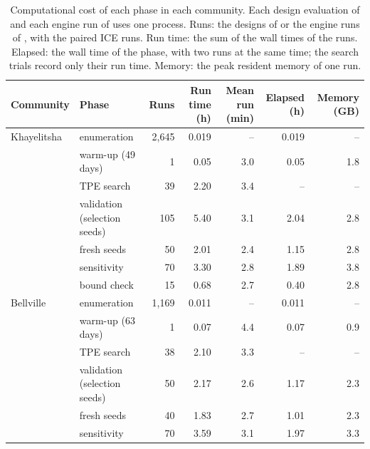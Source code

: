 \begin{table}[htbp]
    \centering
    \footnotesize
    \caption[Computational cost of each phase in each community]{Computational cost of each phase in each community. Each design evaluation of \MR{} and each engine run of \MA{} uses one process. Runs: the designs of \MR{} or the engine runs of \MA, with the paired ICE runs. Run time: the sum of the wall times of the runs. Elapsed: the wall time of the phase, with two runs at the same time; the search trials record only their run time. Memory: the peak resident memory of one run.}
    \label{tab:computational_cost}
    \begin{tabularx}{\linewidth}{@{}lXrrrrr@{}}
        \toprule
        \textbf{Community} & Phase & Runs & Run time (h) & Mean run (min) & Elapsed (h) & Memory (GB) \\
        \midrule
        Khayelitsha & \MR{} enumeration & 2,645 & 0.019 & -- & 0.019 & -- \\
                    & \MA{} warm-up (49 days) & 1 & 0.05 & 3.0 & 0.05 & 1.8 \\
                    & \MA{} TPE search & 39 & 2.20 & 3.4 & -- & -- \\
                    & \MA{} validation (selection seeds) & 105 & 5.40 & 3.1 & 2.04 & 2.8 \\
                    & \MA{} fresh seeds & 50 & 2.01 & 2.4 & 1.15 & 2.8 \\
                    & \MA{} sensitivity & 70 & 3.30 & 2.8 & 1.89 & 3.8 \\
                    & \MA{} bound check & 15 & 0.68 & 2.7 & 0.40 & 2.8 \\
        \addlinespace
        Bellville   & \MR{} enumeration & 1,169 & 0.011 & -- & 0.011 & -- \\
                    & \MA{} warm-up (63 days) & 1 & 0.07 & 4.4 & 0.07 & 0.9 \\
                    & \MA{} TPE search & 38 & 2.10 & 3.3 & -- & -- \\
                    & \MA{} validation (selection seeds) & 50 & 2.17 & 2.6 & 1.17 & 2.3 \\
                    & \MA{} fresh seeds & 40 & 1.83 & 2.7 & 1.01 & 2.3 \\
                    & \MA{} sensitivity & 70 & 3.59 & 3.1 & 1.97 & 3.3 \\

\end{tabularx}
\end{table}
